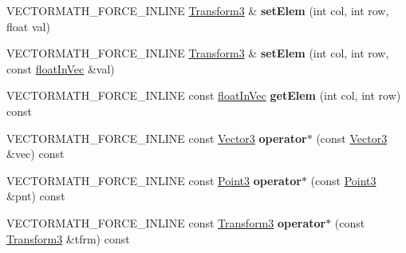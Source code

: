 \begin{DoxyCompactItemize}
\item 
\mbox{\label{classVectormath_1_1Aos_1_1Transform3_a08b89968cf498dd0363601185ca80505}} 
V\+E\+C\+T\+O\+R\+M\+A\+T\+H\+\_\+\+F\+O\+R\+C\+E\+\_\+\+I\+N\+L\+I\+NE \hyperlink{classVectormath_1_1Aos_1_1Transform3}{Transform3} \& {\bfseries set\+Elem} (int col, int row, float val)
\item 
\mbox{\label{classVectormath_1_1Aos_1_1Transform3_ae781be4b2392bb875232bc5dfa5bb5c6}} 
V\+E\+C\+T\+O\+R\+M\+A\+T\+H\+\_\+\+F\+O\+R\+C\+E\+\_\+\+I\+N\+L\+I\+NE \hyperlink{classVectormath_1_1Aos_1_1Transform3}{Transform3} \& {\bfseries set\+Elem} (int col, int row, const \hyperlink{classVectormath_1_1floatInVec}{float\+In\+Vec} \&val)
\item 
\mbox{\label{classVectormath_1_1Aos_1_1Transform3_a09cc59ae0a35f2c6656acb5560a28705}} 
V\+E\+C\+T\+O\+R\+M\+A\+T\+H\+\_\+\+F\+O\+R\+C\+E\+\_\+\+I\+N\+L\+I\+NE const \hyperlink{classVectormath_1_1floatInVec}{float\+In\+Vec} {\bfseries get\+Elem} (int col, int row) const
\item 
\mbox{\label{classVectormath_1_1Aos_1_1Transform3_a970195e443ed8f6b6ed3ea50fdabdc73}} 
V\+E\+C\+T\+O\+R\+M\+A\+T\+H\+\_\+\+F\+O\+R\+C\+E\+\_\+\+I\+N\+L\+I\+NE const \hyperlink{classVectormath_1_1Aos_1_1Vector3}{Vector3} {\bfseries operator$\ast$} (const \hyperlink{classVectormath_1_1Aos_1_1Vector3}{Vector3} \&vec) const
\item 
\mbox{\label{classVectormath_1_1Aos_1_1Transform3_a0cc8681aa52dbdf42d9cf06fc6bf1ecf}} 
V\+E\+C\+T\+O\+R\+M\+A\+T\+H\+\_\+\+F\+O\+R\+C\+E\+\_\+\+I\+N\+L\+I\+NE const \hyperlink{classVectormath_1_1Aos_1_1Point3}{Point3} {\bfseries operator$\ast$} (const \hyperlink{classVectormath_1_1Aos_1_1Point3}{Point3} \&pnt) const
\item 
\mbox{\label{classVectormath_1_1Aos_1_1Transform3_a0d79485637d49309a32d1eb6b3b96998}} 
V\+E\+C\+T\+O\+R\+M\+A\+T\+H\+\_\+\+F\+O\+R\+C\+E\+\_\+\+I\+N\+L\+I\+NE const \hyperlink{classVectormath_1_1Aos_1_1Transform3}{Transform3} {\bfseries operator$\ast$} (const \hyperlink{classVectormath_1_1Aos_1_1Transform3}{Transform3} \&tfrm) const

\end{DoxyCompactItemize}
